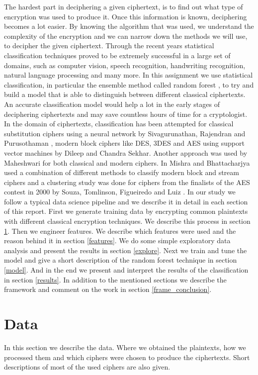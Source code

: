 \documentclass[a4paper]{article}
\begin{document}
The hardest part in deciphering a given ciphertext, is to find out what type of encryption was used to produce it. Once this information is known, deciphering becomes a lot easier. By knowing the algorithm that was used, we understand the complexity of the encryption and we can narrow down the methods we will use, to decipher the given ciphertext. Through the recent years statistical classification techniques proved to be extremely successful in a large set of domains, such as computer vision, speech recognition, handwriting recognition, natural language processing and many more. In this assignment we use statistical classification, in particular the ensemble method called random forest \cite{breiman2001random}, to try and build a model that is able to distinguish between different classical ciphertexts. An accurate classification model would help a lot in the early stages of deciphering ciphertexts and may save countless hours of time for a cryptologist. In the domain of ciphertexts, classification has been attempted for classical substitution ciphers using a neural network by Sivagurunathan, Rajendran and Purusothaman \cite{sivagurunathan2010classification}, modern block ciphers like DES, 3DES and AES using support vector machines by Dileep and Chandra Sekhar\cite{dileep2006identification}. Another approach was used by Maheshwari \cite{maheshwari2001classification} for both classical and modern ciphers. In \cite{mishra2013pattern} Mishra and Bhattacharjya used a combination of different methods to classify modern block and stream ciphers and a clustering study was done for ciphers from the finalists of the AES contest in 2000 by Souza, Tomlinson, Figueiredo and Luiz \cite{decipher}. In our study we follow a typical data science pipeline and we describe it in detail in each section of this report. First we generate training data by encrypting common plaintexts with different classical encryption techniques. We describe this process in section \ref{data}. Then we engineer features. We describe which features were used and the reason behind it in section \ref{features}. We do some simple exploratory data analysis and present the results in section \ref{explore}. Next we train and tune the model and give a short description of the random forest technique in section \ref{model}. And in the end we present and interpret the results of the classification in section \ref {results}. In addition to the mentioned sections we describe the framework and comment on the work in section \ref{frame_conclusion}.

\section{Data} \label{data}
In this section we describe the data. Where we obtained the plaintexts, how we processed them and which ciphers were chosen to produce the ciphertexts. Short descriptions of most of the used ciphers are also given.
\end{document}
